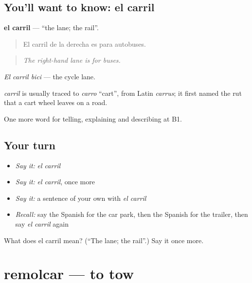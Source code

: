 \subsection*{You'll want to know: el carril}
\textbf{el carril} — \textquotedblleft{}the lane; the rail\textquotedblright{}.

\begin{quote}
El carril de la derecha es para autobuses.
\end{quote}

\begin{quote}
\emph{The right-hand lane is for buses.}
\end{quote}

\emph{El carril bici} — the cycle lane.

\begin{cousinweb}
\emph{carril} is usually traced to \emph{carro} \textquotedblleft{}cart\textquotedblright{}, from Latin \emph{carrus}; it first named the rut that a cart wheel leaves on a road.
\end{cousinweb}

\begin{grammarlens}[title={What you've built}]
One more word for telling, explaining and describing at B1.
\end{grammarlens}

\subsection*{Your turn}
\begin{itemize}
\raggedright
  \item \emph{Say it:} \emph{el carril}
  \item \emph{Say it:} \emph{el carril}, once more
  \item \emph{Say it:} a sentence of your own with \emph{el carril}
  \item \emph{Recall:} say the Spanish for the car park, then the Spanish for the trailer, then say \emph{el carril} again
\end{itemize}

\begin{tcolorbox}[breakable,colback=teal!4,colframe=teal!35!black,title={Before you move on}]
What does el carril mean? (\textquotedblleft{}The lane; the rail\textquotedblright{}.) Say it once more.
\end{tcolorbox}
\section[remolcar]{remolcar — to tow}

